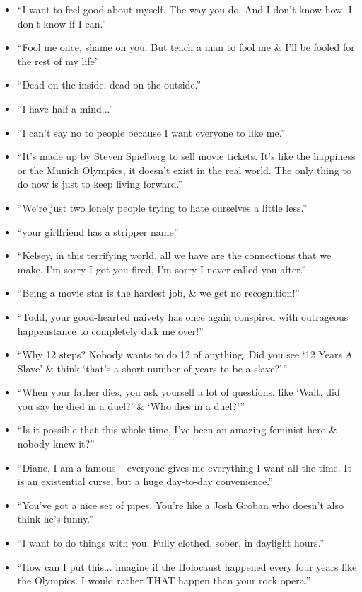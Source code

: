\documentclass{article}
\begin{document}
\begin{enumerate}
\begin{itemize}
    	\item ``I want to feel good about myself. The way you do. And I don't know how. I don't know if I can.''
    	\item ``Fool me once, shame on you. But teach a man to fool me \& I'll be fooled for the rest of my life'' 
    	\item ``Dead on the inside, dead on the outside.''
    	\item ``I have half a mind...''
    	\item ``I can't say no to people because I want everyone to like me.''
    	\item ``It's made up by Steven Spielberg to sell movie tickets. It's like the happiness or the Munich Olympics, it doesn't exist in the real world. The only thing to do now is just to keep living forward.''
    	\item ``We're just two lonely people trying to hate ourselves a little less.''
    	\item ``your girlfriend has a stripper name''
    	\item ``Kelsey, in this terrifying world, all we have are the connections that we make. I'm sorry I got you fired, I'm sorry I never called you after.''
    	\item ``Being a movie star is the hardest job, \& we get no recognition!''
    	\item ``Todd, your good-hearted naivety has once again conspired with outrageous happenstance to completely dick me over!''
    	\item ``Why 12 steps? Nobody wants to do 12 of anything. Did you see `12 Years A Slave' \& think `that's a short number of years to be a slave?'''
    	\item ``When your father dies, you ask yourself a lot of questions, like `Wait, did you say he died in a duel?' \& `Who dies in a duel?'''
    	\item ``Is it possible that this whole time, I've been an amazing feminist hero \& nobody knew it?''
    	\item ``Diane, I am a famous -- everyone gives me everything I want all the time. It is an existential curse, but a huge day-to-day convenience.''
    	\item ``You've got a nice set of pipes. You're like a Josh Groban who doesn't also think he's funny.''
    	\item ``I want to do things with you. Fully clothed, sober, in daylight hours.''
    	\item ``How can I put this... imagine if the Holocaust happened every four years like the Olympics. I would rather THAT happen than your rock opera.''

\end{itemize}
\end{enumerate}
\end{document}
